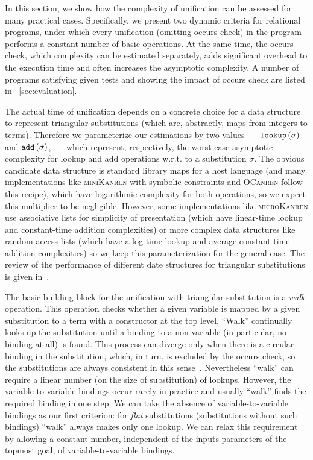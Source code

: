 In this section, we show how the complexity of unification can be assessed for many practical cases. Specifically, we present two dynamic criteria
for relational programs, under which every unification (omitting occurs check) in the program performs a constant number of basic operations. At the same
time, the occurs check, which complexity can be estimated separately, adds significant overhead to the execution time and often increases the asymptotic complexity.
A number of programs satisfying given tests and showing the impact of occurs check are listed in \sectionword~\ref{sec:evaluation}.

The actual time of unification depends on a concrete choice for a data structure to represent triangular substitutions (which are, abstractly, maps from integers to terms).
Therefore we parameterize our estimations by two values~--- $\texttt{lookup}\,(\sigma)$ and $\texttt{add}\,(\sigma)$,~--- which represent, respectively, the
worst-case asymptotic complexity for lookup and add operations w.r.t. to a substitution $\sigma$. The obvious candidate data structure is standard library maps
for a host language (and many implementations like \textsc{miniKanren}-with-symbolic-constraints and \textsc{OCanren} follow this recipe), which have logarithmic complexity for both operations,
so we expect this multiplier to be negligible. However, some implementations like \textsc{microKanren} use associative lists for simplicity of presentation (which have linear-time
lookup and constant-time addition complexities) or more complex data structures like random-access lists (which have a log-time lookup and average constant-time addition complexities)
so we keep this parameterization for the general case. The review of the performance of different date structures for triangular substitutions is given in~\cite{SubstDataStructs}.

The basic building block for the unification with triangular substitution is a \emph{walk} operation. This operation checks whether a given variable is mapped by a given substitution to a
term with a constructor at the top level. ``Walk'' continually looks up the substitution until a binding to a non-variable (in particular, no binding at all) is found. This
process can diverge only when there is a circular binding in the substitution, which, in turn, is excluded by the occurs check, so the substitutions are always consistent
in this sense~\cite{NominalUnificationWithTriangularSubstitutions}. Nevertheless ``walk'' can require a linear number (on the size of substitution) of lookups.
However, the variable-to-variable bindings occur rarely in practice and usually ``walk'' finds the required binding in one step. We can take the absence of variable-to-variable bindings
as our first criterion: for \emph{flat} substitutions (substitutions without such bindings) ``walk'' always makes only one lookup. We can relax this requirement by allowing a
constant number, independent of the inputs parameters of the topmost goal, of variable-to-variable bindings.

